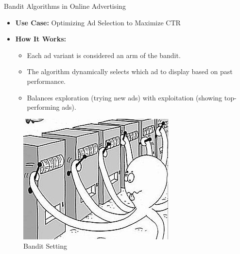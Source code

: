 \documentclass{beamer}
\begin{document}
\begin{frame}{Bandit Algorithms in Online Advertising}
    \begin{itemize}
        \item \textbf{Use Case:} Optimizing Ad Selection to Maximize CTR
        
        \item \textbf{How It Works:}
        \begin{itemize}
            \item Each ad variant is considered an arm of the bandit.
            \item The algorithm dynamically selects which ad to display based on past performance.
            \item Balances exploration (trying new ads) with exploitation (showing top-performing ads).
        \end{itemize}
        
    \end{itemize}
    
    \vspace{0.5cm}
    \begin{figure}
        \centering
        \includegraphics[width=0.4\linewidth]{images/bandit_setting.jpg}
        \caption{Bandit Setting}
    \end{figure}
\end{frame}
\end{document}
